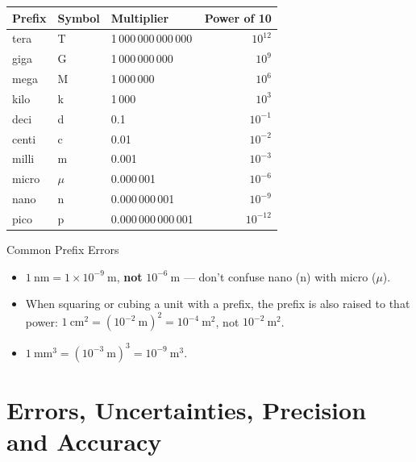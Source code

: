 \begin{center}
\renewcommand{\arraystretch}{1.5}
\begin{tabular}{@{} l l l r @{}}
\toprule
\textbf{Prefix} & \textbf{Symbol} & \textbf{Multiplier} & \textbf{Power of 10} \\
\midrule
tera  & T & 1\,000\,000\,000\,000 & $10^{12}$ \\
giga  & G & 1\,000\,000\,000      & $10^{9}$  \\
mega  & M & 1\,000\,000           & $10^{6}$  \\
kilo  & k & 1\,000                & $10^{3}$  \\
deci  & d & 0.1                   & $10^{-1}$ \\
centi & c & 0.01                  & $10^{-2}$ \\
milli & m & 0.001                 & $10^{-3}$ \\
micro & $\mu$ & 0.000\,001        & $10^{-6}$ \\
nano  & n & 0.000\,000\,001       & $10^{-9}$ \\
pico  & p & 0.000\,000\,000\,001  & $10^{-12}$ \\
\bottomrule
\end{tabular}
\end{center}

\begin{warningbox}{Common Prefix Errors}
\begin{itemize}[itemsep=2pt]
  \item $1\ \text{nm} = 1\times10^{-9}\ \text{m}$, \textbf{not} $10^{-6}\ \text{m}$ — don't confuse nano (n) with micro ($\mu$).
  \item When squaring or cubing a unit with a prefix, the prefix is also raised to that power: $1\ \text{cm}^2 = (10^{-2}\ \text{m})^2 = 10^{-4}\ \text{m}^2$, not $10^{-2}\ \text{m}^2$.
  \item $1\ \text{mm}^3 = (10^{-3}\ \text{m})^3 = 10^{-9}\ \text{m}^3$.
\end{itemize}
\end{warningbox}

\pagebreak

\section{Errors, Uncertainties, Precision and Accuracy}

